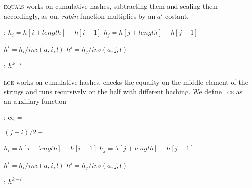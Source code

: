 \textsc{equals} works on cumulative hashes, subtracting them and scaling them
accordingly, as our $rabin$ function multiplies by an $a^{i}$ costant.

\begin{algorithmic}[1]
  :
    \State $h_i = h[i + length] - h[i - 1]$\;
    \State $h_j = h[j + length] - h[j - 1]$\;

    \State $h^{i} = h_i / inv(a, i, l)$\;
    \State $h^{j} = h_j / inv(a, j, l)$\;

    \;
    \EndFunction

    :
    \Return $h^{k - l}$
    \EndFunction
\end{algorithmic}

\textsc{lce} works on cumulative hashes, checks the equality on the middle element
of the strings and runs recursively on the half with different hashing.
We define \textsc{lce} as an auxiliary function

\begin{algorithmic}[1]
  :
    \State eq = \;

        \Else $(j - i) / 2 + $      %
    \EndIf

    \State $h_i = h[i + length] - h[i - 1]$\;
    \State $h_j = h[j + length] - h[j - 1]$\;

    \State $h^{i} = h_i / inv(a, i, l)$\;
    \State $h^{j} = h_j / inv(a, j, l)$\;

    \;
    \EndFunction

    :
    \Return $h^{k - l}$
    \EndFunction
\end{algorithmic}
